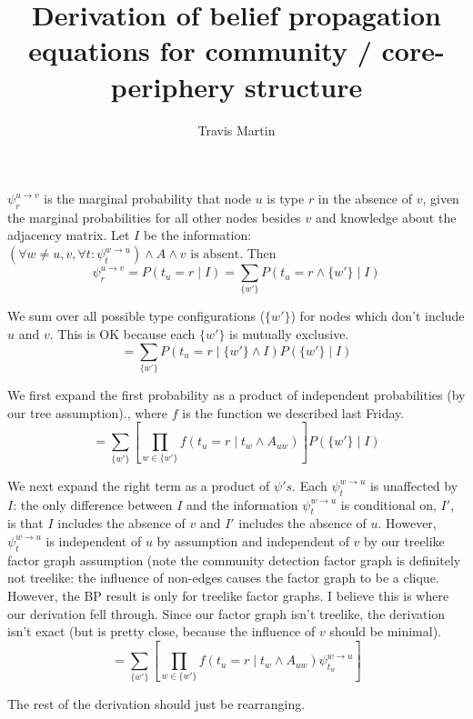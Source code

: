 \documentclass{article}
\title{Derivation of belief propagation equations for community / core-periphery structure}
\author{Travis Martin}
\begin{document}
\maketitle
$\psi_r^{u \rightarrow v}$ is the marginal probability that node $u$ is type $r$ in the absence of $v$, given the marginal probabilities for all other nodes besides $v$ and knowledge about the adjacency matrix. Let $I$ be the information: $(\forall w \neq u,v, \forall t:\psi_{t}^{w \rightarrow u}) \land A \land v\text{ is absent}$. Then
$$\psi_r^{u\rightarrow v} = P(t_u = r \mid I) = \sum_{\{w'\}} P(t_u = r \land \{w'\}\mid I) $$

We sum over all possible type configurations ($\{w'\}$) for nodes which don't include $u$ and $v$. This is OK because each $\{w'\}$ is mutually exclusive.
$$ = \sum_{\{w'\}} P(t_u = r \mid \{w'\} \land I) P(\{w'\} \mid I)$$

We first expand the first probability as a product of independent probabilities (by our tree assumption)., where $f$ is the function we described last Friday.
$$ = \sum_{\{w'\}} \left[\prod_{w \in \{w'\}} f(t_u = r \mid t_w \land A_{uw})\right] P(\{w'\} \mid I)$$

We next expand the right term as a product of $\psi's$. Each $\psi_t^{w\rightarrow u}$ is unaffected by $I$: the only difference between $I$ and the information $\psi_t^{w\rightarrow u}$ is conditional on, $I'$, is that $I$ includes the absence of $v$ and $I'$ includes the absence of $u$. However, $\psi_t^{w\rightarrow u}$ is independent of $u$ by assumption and independent of $v$ by our treelike factor graph assumption (note the community detection factor graph is definitely not treelike: the influence of non-edges causes the factor graph to be a clique. However, the BP result is only for treelike factor graphs. I believe this is where our derivation fell through. Since our factor graph isn't treelike, the derivation isn't exact (but is pretty close, because the influence of $v$ should be minimal).
$$ = \sum_{\{w'\}} \left[\prod_{w \in \{w'\}} f(t_u = r \mid t_w \land A_{uw}) \psi_{t_w}^{w \rightarrow u}\right]$$

The rest of the derivation should just be rearranging.
\end{document}
